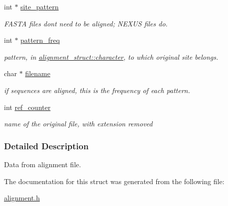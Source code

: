 \begin{DoxyCompactItemize}
int $\ast$ \hyperlink{structalignment__struct_ab599779f0254908bf21a78a503ee71bf}{site\+\_\+pattern}
\begin{DoxyCompactList}\small\item\em F\+A\+S\+TA files don\textquotesingle{}t need to be aligned; N\+E\+X\+US files do. \end{DoxyCompactList}\item 
\mbox{\label{structalignment__struct_ac026c9e98a3ec37876fb6429b0e6fdb1}} 
int $\ast$ \hyperlink{structalignment__struct_ac026c9e98a3ec37876fb6429b0e6fdb1}{pattern\+\_\+freq}
\begin{DoxyCompactList}\small\item\em pattern, in \hyperlink{structalignment__struct_a5f298db9c22602b033f76d8e08469f0f}{alignment\+\_\+struct\+::character}, to which original site belongs. \end{DoxyCompactList}\item 
\mbox{\label{structalignment__struct_ac559cf9acf696eca7fea967c5c05dd18}} 
char $\ast$ \hyperlink{structalignment__struct_ac559cf9acf696eca7fea967c5c05dd18}{filename}
\begin{DoxyCompactList}\small\item\em if sequences are aligned, this is the frequency of each pattern. \end{DoxyCompactList}\item 
\mbox{\label{structalignment__struct_a301172f590ef4fd3afb783cf417f6b1f}} 
int \hyperlink{structalignment__struct_a301172f590ef4fd3afb783cf417f6b1f}{ref\+\_\+counter}
\begin{DoxyCompactList}\small\item\em name of the original file, with extension removed \end{DoxyCompactList}\end{DoxyCompactItemize}


\subsubsection{Detailed Description}
Data from alignment file. 

The documentation for this struct was generated from the following file\+:\begin{DoxyCompactItemize}
\item 
\hyperlink{alignment_8h}{alignment.\+h}\end{DoxyCompactItemize}
